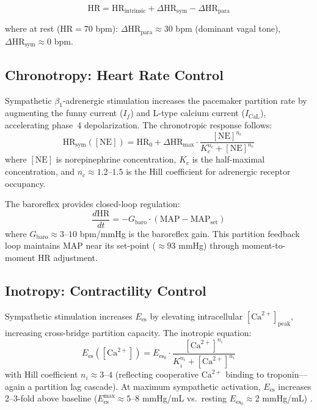 \documentclass[12pt,a4paper]{article}
\theoremstyle{remark}
\newcommand{\Ees}{E_{\mathrm{es}}}
\newcommand{\HR}{\mathrm{HR}}
\newcommand{\MAP}{\mathrm{MAP}}
\begin{document}
\begin{equation}
    \HR = \HR_{\mathrm{intrinsic}} + \Delta\HR_{\mathrm{sym}} - \Delta\HR_{\mathrm{para}}
    \label{eq:HR_autonomic}
\end{equation}

\noindent
where at rest ($\HR = 70$ bpm): $\Delta\HR_{\mathrm{para}} \approx 30$ bpm (dominant vagal tone), $\Delta\HR_{\mathrm{sym}} \approx 0$ bpm.

\subsection{Chronotropy: Heart Rate Control}

Sympathetic $\beta_1$-adrenergic stimulation increases the pacemaker partition rate by augmenting the funny current ($I_f$) and L-type calcium current ($I_{\mathrm{CaL}}$), accelerating phase~4 depolarization. The chronotropic response follows:
\begin{equation}
    \HR_{\mathrm{sym}}([\mathrm{NE}]) = \HR_0 + \Delta\HR_{\max} \cdot \frac{[\mathrm{NE}]^{n_c}}{K_c^{n_c} + [\mathrm{NE}]^{n_c}}
    \label{eq:chronotropy}
\end{equation}
where $[\mathrm{NE}]$ is norepinephrine concentration, $K_c$ is the half-maximal concentration, and $n_c \approx 1.2$--$1.5$ is the Hill coefficient for adrenergic receptor occupancy.

The baroreflex provides closed-loop regulation:
\begin{equation}
    \frac{d\HR}{dt} = -G_{\mathrm{baro}} \cdot (\MAP - \MAP_{\mathrm{set}})
    \label{eq:baroreflex_HR}
\end{equation}
where $G_{\mathrm{baro}} \approx 3$--$10$ bpm/mmHg is the baroreflex gain. This partition feedback loop maintains MAP near its set-point ($\approx 93$ mmHg) through moment-to-moment HR adjustment.

\subsection{Inotropy: Contractility Control}

Sympathetic stimulation increases $\Ees$ by elevating intracellular $[\mathrm{Ca}^{2+}]_{\mathrm{peak}}$, increasing cross-bridge partition capacity. The inotropic equation:
\begin{equation}
    \Ees([\mathrm{Ca}^{2+}]) = \Ees_0 \cdot \frac{[\mathrm{Ca}^{2+}]^{n_i}}{K_i^{n_i} + [\mathrm{Ca}^{2+}]^{n_i}}
    \label{eq:inotropy}
\end{equation}
with Hill coefficient $n_i \approx 3$--$4$ (reflecting cooperative $\mathrm{Ca}^{2+}$ binding to troponin—again a partition lag cascade). At maximum sympathetic activation, $\Ees$ increases 2--3-fold above baseline ($\Ees^{\max} \approx 5$--$8$ mmHg/mL vs.\ resting $\Ees_0 \approx 2$ mmHg/mL) \cite{sagawa1988cardiac}.
\end{document}
